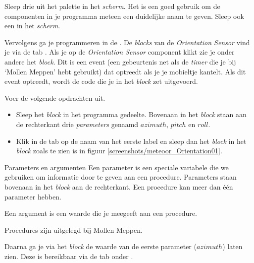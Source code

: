 \begin{opgave}
    \opgVraag
  Sleep drie  uit het  palette in het \emph{scherm}. Het is een goed gebruik om de componenten in je programma meteen een duidelijke naam te geven. Sleep ook een  in het \emph{scherm}.
\end{opgave}

Vervolgens ga je programmeren in de . De \emph{blocks} van de \emph{Orientation Sensor} vind je via de tab . Als je op de \emph{Orientation Sensor} component klikt zie je onder andere het  \emph{block}. Dit is een event (een gebeurtenis net als de \emph{timer} die je bij `Mollen Meppen' hebt gebruikt) dat optreedt als je je mobieltje kantelt. Als dit event optreedt, wordt de code die je in het  \emph{block} zet uitgevoerd. 

\begin{opgave}
    \opgVraag
  Voer de volgende opdrachten uit.
  \begin{itemize}
    \item Sleep het  \emph{block} in het programma gedeelte. Bovenaan in het \emph{block} staan aan de rechterkant drie \emph{parameters} genaamd $azimuth$, $pitch$ en $roll$.
    \item Klik in de tab  op de naam van het eerste label en sleep dan het  \emph{block} in het  \emph{block} zoals te zien is in figuur \ref{screenshots/meteoor_Orientation01}.
  \end{itemize}
\end{opgave}


\begin{derivation}{Parameters en argumenten}
Een parameter is een speciale variabele die we gebruiken om informatie door te geven aan een procedure. Parameters staan bovenaan in het \emph{block} aan de rechterkant. Een procedure kan meer dan \'e\'en parameter hebben.

Een argument is een waarde die je meegeeft aan een procedure.

Procedures zijn uitgelegd bij Mollen Meppen.
\end{derivation}

Daarna ga je via het  \emph{block} de waarde van de eerste parameter ($azimuth$) laten zien. Deze is bereikbaar via de  tab onder .

